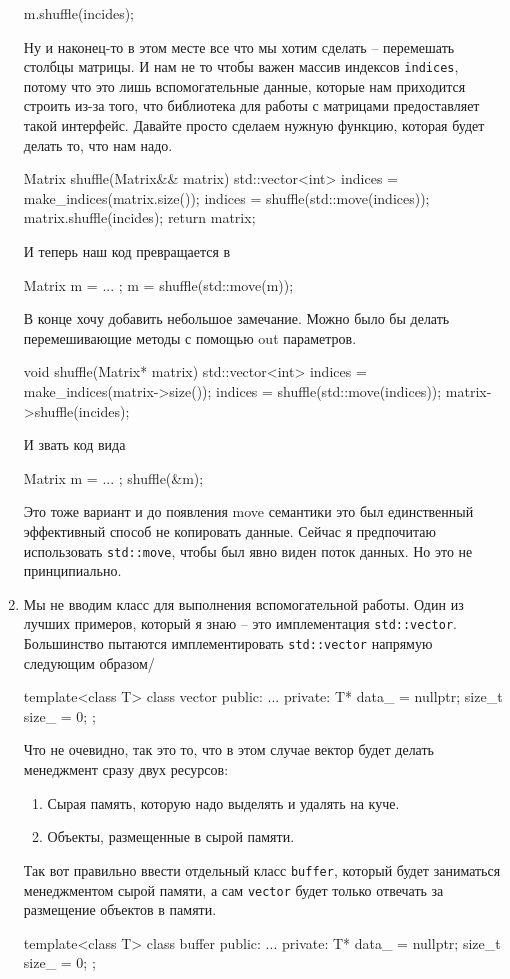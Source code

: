 \begin{enumerate}
\begin{cppcode}
m.shuffle(incides);
\end{cppcode}
Ну и наконец-то в этом месте все что мы хотим сделать -- перемешать столбцы матрицы.
И нам не то чтобы важен массив индексов \verb"indices", потому что это лишь вспомогательные данные, которые нам приходится строить из-за того, что библиотека для работы с матрицами предоставляет такой интерфейс.
Давайте просто сделаем нужную функцию, которая будет делать то, что нам надо.
\begin{cppcode}
Matrix shuffle(Matrix&& matrix) {
  std::vector<int> indices  = make_indices(matrix.size());
  indices = shuffle(std::move(indices));
  matrix.shuffle(incides);
  return matrix;
}
\end{cppcode}
И теперь наш код превращается в
\begin{cppcode}
Matrix m = ... ;
m = shuffle(std::move(m));
\end{cppcode}
В конце хочу добавить небольшое замечание.
Можно было бы делать перемешивающие методы с помощью out параметров.
\begin{cppcode}
void shuffle(Matrix* matrix) {
  std::vector<int> indices  = make_indices(matrix->size());
  indices = shuffle(std::move(indices));
  matrix->shuffle(incides);
}
\end{cppcode}
И звать  код вида
\begin{cppcode}
Matrix m = ... ;
shuffle(&m);
\end{cppcode}
Это тоже вариант и до появления move семантики это был единственный эффективный способ не копировать данные.
Сейчас я предпочитаю использовать \verb"std::move", чтобы был явно виден поток данных.
Но это не принципиально.

\item Мы не вводим класс для выполнения вспомогательной работы.
Один из лучших примеров, который я знаю -- это имплементация \verb"std::vector".
Большинство пытаются имплементировать \verb"std::vector" напрямую следующим образом/
\begin{cppcode}
template<class T>
class vector {
public:
  ...
private:
  T* data_ = nullptr;
  size_t size_ = 0;
};
\end{cppcode}
Что не очевидно, так это то, что в этом случае вектор будет делать менеджмент сразу двух ресурсов:
\begin{enumerate}
\item Сырая память, которую надо выделять и удалять на куче.

\item Объекты, размещенные в сырой памяти.
\end{enumerate}
Так вот правильно ввести отдельный класс \verb"buffer", который будет заниматься менеджментом сырой памяти, а сам \verb"vector" будет только отвечать за размещение объектов в памяти.
\begin{cppcode}
template<class T>
class buffer {
public:
  ...
private:
  T* data_ = nullptr;
  size_t size_ = 0;
};


\end{cppcode}
\end{enumerate}
